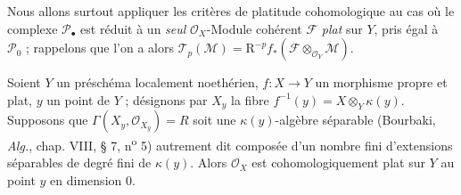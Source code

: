 Nous allons surtout appliquer les critères de platitude cohomologique au cas où
le complexe $\mathscr P_\bullet$ est réduit à un \emph{seul}
$\mathscr O_X$-Module cohérent $\mathscr F$ \emph{plat} sur $Y$, pris égal à
$\mathscr P_0$ ; rappelons que l'on a alors
$\mathscr T_p(\mathscr M)=\mathrm R^{-p}f_*
(\mathscr F\otimes_{\mathscr O_Y}\mathscr M)$.

\begin{proposition}[7.8.6]
Soient $Y$ un préschéma localement noethérien, $f:X\to Y$ un morphisme propre
et plat, $y$ un point de $Y$ ; désignons par $X_y$ la fibre
$f^{-1}(y)=X\otimes_Y\kappa(y)$. Supposons que
$\Gamma(X_y,\mathscr O_{X_y})=R$ soit une $\kappa(y)$-algèbre séparable
(Bourbaki, \emph{Alg.}, chap. VIII, § 7, n\textsuperscript{o} 5) autrement dit
composée d'un nombre fini d'extensions séparables de degré fini de $\kappa(y)$.
Alors $\mathscr O_X$ est cohomologiquement plat sur $Y$ au point $y$ en
dimension 0.
\end{proposition}

